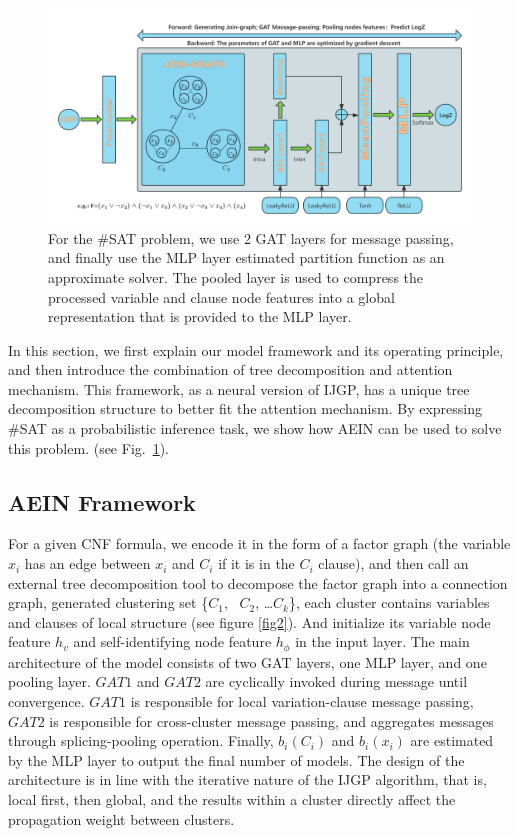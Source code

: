 \begin{figure}[h]
\centering 
\includegraphics[width=1\textwidth]{png/AEIN2.png}
\caption{For the \#SAT problem, we use 2 GAT layers for message passing, and finally use the MLP 
layer estimated partition function as an approximate solver. The pooled layer is used to compress 
the processed variable and clause node features into a global representation that is provided to 
the MLP layer.} 
\label{fig1}
\end{figure}

In this section, we first explain our model framework and its operating principle, and then introduce 
the combination of tree decomposition and attention mechanism. This framework, as a neural version of 
IJGP, has a unique tree decomposition structure to better fit the attention mechanism. By expressing 
\#SAT as a probabilistic inference task, we show how AEIN can be used to solve this problem. (see Fig.~\ref{fig1}).

\subsection{AEIN Framework}
For a given CNF formula, we encode it in the form of a factor graph (the variable \(x_i\) has an 
edge between \(x_i\) and \(C_i\) if it is in the \(C_i\) clause), and then call an external tree 
decomposition tool to decompose the factor graph into a connection graph, generated clustering set 
\{\(C_1\), \ \(C_2\), \ldots \(C_k\)\}, each cluster contains variables and clauses of local structure 
(see figure \ref{fig2}). And initialize its variable node feature \(h_v\) and self-identifying node 
feature \(h_\phi\) in the input layer. The main architecture of the model consists of two GAT layers, 
one MLP layer, and one pooling layer. \(GAT1\) and \(GAT2\) are cyclically invoked during message 
until convergence. \(GAT1\) is responsible for local variation-clause message passing, \(GAT2\) 
is responsible for cross-cluster message passing, and aggregates messages through splicing-pooling 
operation. Finally, \(b_i(C_i)\) and \(b_i(x_i)\) are estimated by the MLP layer to output the final 
number of models. The design of the architecture is in line with the iterative nature of the IJGP 
algorithm, that is, local first, then global, and the results within a cluster directly affect the 
propagation weight between clusters.

